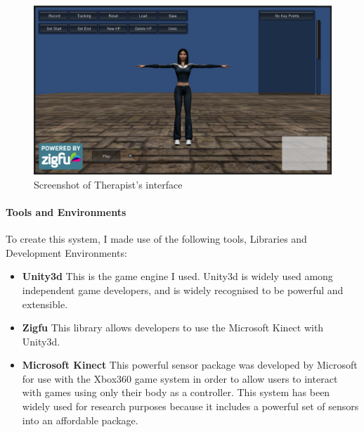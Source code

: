 \documentclass{report}
\begin{document}
\begin{figure}[htb]
	\includegraphics[width=\linewidth]{TherapistsInt.png}
	\caption{Screenshot of Therapist's interface}
	\label{Gameshot2}
\end{figure}

\paragraph{Tools and Environments}
To create this system, I made use of the following tools, Libraries and Development Environments:
\begin{itemize}
	\item \textbf{Unity3d} This is the game engine I used. Unity3d is widely used among independent game developers, and is widely recognised to be powerful and extensible.

	\item \textbf{Zigfu} This library allows developers to use the Microsoft Kinect with Unity3d. 

	\item \textbf{Microsoft Kinect} This powerful sensor package was developed by Microsoft for use with the Xbox360 game system in order to allow users to interact with games using only their body as a controller. This system has been widely used for research purposes because it includes a powerful set of sensors into an affordable package.
\end{itemize}
\end{document}
